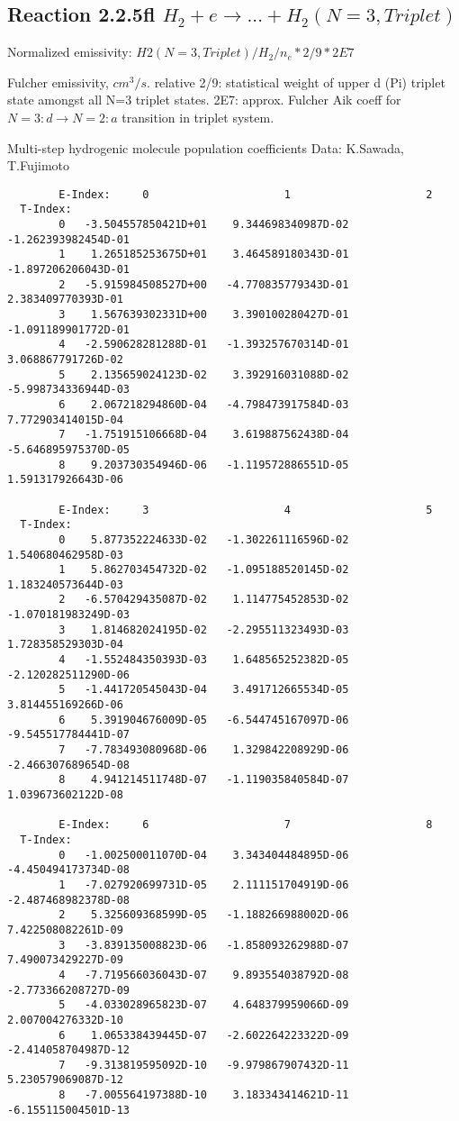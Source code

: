 \documentclass[12pt,dvipdfmx]{article}
\begin{document}
{\newpage
\subsection{
Reaction 2.2.5fl $H_2 + e \rightarrow ...+ H_2(N=3,Triplet)$}

Normalized emissivity: $H2(N=3, Triplet)/H_2/n_e*2/9*2E7 $

 Fulcher emissivity, $cm^3/s$. relative 2/9: statistical weight of upper d (Pi) triplet state
amongst all N=3 triplet states.
2E7: approx. Fulcher Aik coeff for $N=3: d \rightarrow N=2: a$ transition in triplet system.

 Multi-step hydrogenic molecule population coefficients
 Data: K.Sawada, T.Fujimoto \cite{kn:Sawada}

\begin{small}\begin{verbatim}
        E-Index:     0                     1                     2
  T-Index:
        0   -3.504557850421D+01    9.344698340987D-02   -1.262393982454D-01
        1    1.265185253675D+01    3.464589180343D-01   -1.897206206043D-01
        2   -5.915984508527D+00   -4.770835779343D-01    2.383409770393D-01
        3    1.567639302331D+00    3.390100280427D-01   -1.091189901772D-01
        4   -2.590628281288D-01   -1.393257670314D-01    3.068867791726D-02
        5    2.135659024123D-02    3.392916031088D-02   -5.998734336944D-03
        6    2.067218294860D-04   -4.798473917584D-03    7.772903414015D-04
        7   -1.751915106668D-04    3.619887562438D-04   -5.646895975370D-05
        8    9.203730354946D-06   -1.119572886551D-05    1.591317926643D-06

        E-Index:     3                     4                     5
  T-Index:
        0    5.877352224633D-02   -1.302261116596D-02    1.540680462958D-03
        1    5.862703454732D-02   -1.095188520145D-02    1.183240573644D-03
        2   -6.570429435087D-02    1.114775452853D-02   -1.070181983249D-03
        3    1.814682024195D-02   -2.295511323493D-03    1.728358529303D-04
        4   -1.552484350393D-03    1.648565252382D-05   -2.120282511290D-06
        5   -1.441720545043D-04    3.491712665534D-05    3.814455169266D-06
        6    5.391904676009D-05   -6.544745167097D-06   -9.545517784441D-07
        7   -7.783493080968D-06    1.329842208929D-06   -2.466307689654D-08
        8    4.941214511748D-07   -1.119035840584D-07    1.039673602122D-08

        E-Index:     6                     7                     8
  T-Index:
        0   -1.002500011070D-04    3.343404484895D-06   -4.450494173734D-08
        1   -7.027920699731D-05    2.111151704919D-06   -2.487468982378D-08
        2    5.325609368599D-05   -1.188266988002D-06    7.422508082261D-09
        3   -3.839135008823D-06   -1.858093262988D-07    7.490073429227D-09
        4   -7.719566036043D-07    9.893554038792D-08   -2.773366208727D-09
        5   -4.033028965823D-07    4.648379959066D-09    2.007004276332D-10
        6    1.065338439445D-07   -2.602264223322D-09   -2.414058704987D-12
        7   -9.313819595092D-10   -9.979867907432D-11    5.230579069087D-12
        8   -7.005564197388D-10    3.183343414621D-11   -6.155115004501D-13


\end{verbatim}
\end{small}}
\end{document}
